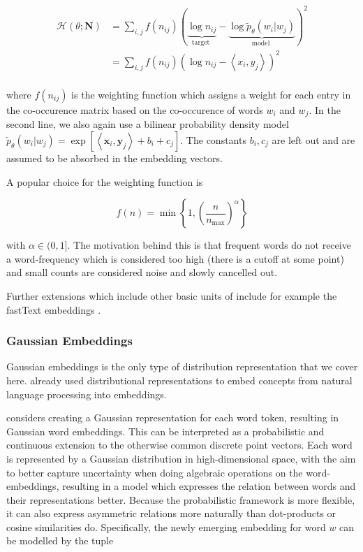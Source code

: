 \documentclass[a4paper,12pt,twoside,openright]{report}
\begin{document}
\begin{align}
\mathcal{H}(\theta ; \mathbf{N}) &=
\sum_{i, j} f\left(n_{i j}\right)(\underbrace{\log n_{i j}}_{\text {target }}-\underbrace{\log \tilde{p}_{\theta}\left(w_{i} | w_{j}\right)}_{\text {model }})^{2} \\
&= \sum_{i, j} f\left(n_{i j}\right)(\log n_{i j} - \left\langle x_i, y_j \right\rangle )^{2} \\
\end{align}

where $f(n_{ij})$ is the weighting function which assigns a weight for each entry in the co-occurence matrix based on the co-occurence of words $w_i$ and $w_j$. 
In the second line, we also again use a bilinear probability density model $\tilde{p}_{\theta}\left(w_{i} | w_{j}\right)=\exp \left[\left\langle\mathbf{x}_{i}, \mathbf{y}_{j}\right\rangle+b_{i}+c_{j}\right]$.
The constants $b_i, c_j$ are left out and are assumed to be absorbed in the embedding vectors.

A popular choice for the weighting function is 

$$
f(n) = \min \left\lbrace 1, \left(\frac{n}{n_{\max}}\right)^{\alpha} \right\rbrace
$$

with $\alpha \in (0, 1]$.
The motivation behind this is that frequent words do not receive a word-frequency which is considered too high (there is a cutoff at some point) and small counts are considered noise and slowly cancelled out.

Further extensions which include other basic units of include for example the fastText embeddings \cite{bojanowski17}.

\subsubsection{Gaussian Embeddings}

Gaussian embeddings is the only type of distribution representation that we cover here. 
\cite{bengio06} already used distributional representations to embed concepts from natural language processing into embeddings.

\cite{vilnis14} considers creating a Gaussian representation for each word token, resulting in Gaussian word embeddings.
This can be interpreted as a probabilistic and continuous extension to the otherwise common discrete point vectors.
Each word is represented by a Gaussian distribution in high-dimensional space, with the aim to better capture uncertainty when doing algebraic operations on the word-embeddings, resulting in a model which expresses the relation between words and their representations better.
Because the probabilistic framework is more flexible, it can also express asymmetric relations more naturally than dot-products or cosine similarities do.  
Specifically, the newly emerging embedding for word $w$ can be modelled by the tuple 
\end{document}
